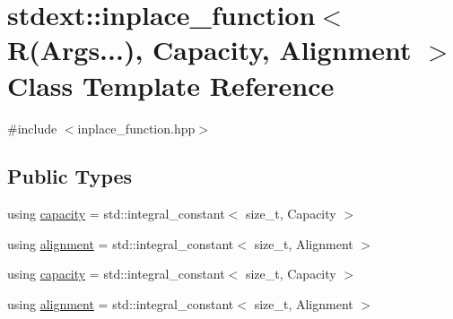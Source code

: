 \hypertarget{classstdext_1_1inplace__function_3_01R_07Args_8_8_8_08_00_01Capacity_00_01Alignment_01_4}{}\section{stdext\+:\+:inplace\+\_\+function$<$ R(Args...), Capacity, Alignment $>$ Class Template Reference}
\label{classstdext_1_1inplace__function_3_01R_07Args_8_8_8_08_00_01Capacity_00_01Alignment_01_4}


{\ttfamily \#include $<$inplace\+\_\+function.\+hpp$>$}

\subsection*{Public Types}
\begin{DoxyCompactItemize}
\item 
using \hyperlink{classstdext_1_1inplace__function_3_01R_07Args_8_8_8_08_00_01Capacity_00_01Alignment_01_4_a7aeca8cbeac6770ddbbe3d2de1606119}{capacity} = std\+::integral\+\_\+constant$<$ size\+\_\+t, Capacity $>$
\item 
using \hyperlink{classstdext_1_1inplace__function_3_01R_07Args_8_8_8_08_00_01Capacity_00_01Alignment_01_4_a6fb11b21afeb300682fb544ff2f9c4db}{alignment} = std\+::integral\+\_\+constant$<$ size\+\_\+t, Alignment $>$
\item 
using \hyperlink{classstdext_1_1inplace__function_3_01R_07Args_8_8_8_08_00_01Capacity_00_01Alignment_01_4_a7aeca8cbeac6770ddbbe3d2de1606119}{capacity} = std\+::integral\+\_\+constant$<$ size\+\_\+t, Capacity $>$
\item 
using \hyperlink{classstdext_1_1inplace__function_3_01R_07Args_8_8_8_08_00_01Capacity_00_01Alignment_01_4_a6fb11b21afeb300682fb544ff2f9c4db}{alignment} = std\+::integral\+\_\+constant$<$ size\+\_\+t, Alignment $>$
\end{DoxyCompactItemize}
